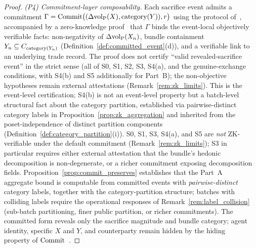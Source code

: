 \begin{proof}
\emph{(P4) Commitment-layer composability.}
Each sacrifice event admits a commitment
$\Gamma = \mathrm{Commit}\bigl((\Delta{\operatorname{vol}_{\mathrm{P}}}(X), \mathrm{category}(Y)), r\bigr)$
using the protocol of~\citep[Definition~6]{lasser2026exo},
accompanied by a zero-knowledge
proof~\citep[Definition~7]{lasser2026exo} that $\Gamma$ binds
the event-local objectively verifiable facts: non-negativity
of $\Delta{\operatorname{vol}_{\mathrm{P}}}(X_n)$, bundle containment $Y_n \subseteq
C_{\mathrm{category}(Y_{n})}$ (Definition~\ref{def:committed_event}(d)), and
a verifiable link to an underlying trade record.  The proof
does not certify ``valid revealed-sacrifice event'' in the
strict sense (all of S0, S1, S2, S3, S4(a), and the
genuine-exchange conditions, with S4(b) and S5 additionally
for Part~B); the non-objective hypotheses remain external
attestations (Remark~\ref{rem:zk_limits}).  This is the event-level
certification; S4(b) is not an event-level property but a
batch-level structural fact about the category partition,
established via pairwise-distinct category labels in
Proposition~\ref{prop:zk_aggregation} and inherited from the
poset-independence of distinct partition components
(Definition~\ref{def:category_partition}(i)).  S0, S1, S3,
S4(a), and S5 are \emph{not} ZK-verifiable under the default
commitment (Remark~\ref{rem:zk_limits}); S3 in particular
requires either external attestation that the bundle's
hedonic decomposition is non-degenerate, or a richer
commitment exposing decomposition fields.
Proposition~\ref{prop:commit_preserves} establishes that the
Part~A aggregate bound is computable from committed events with
\emph{pairwise-distinct} category labels, together with the
category-partition structure; batches with colliding labels
require the operational responses of
Remark~\ref{rem:label_collision} (sub-batch partitioning, finer
public partition, or richer commitments).  The committed form
reveals only the sacrifice magnitude and bundle category; agent
identity, specific $X$ and $Y$, and counterparty remain hidden
by the hiding property of
$\mathrm{Commit}$~\citep{pedersen1991noninteractive,lasser2026exo}.
\end{proof}

